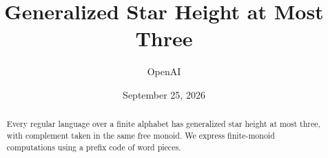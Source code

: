 \documentclass[11pt,a4paper]{article}
\title{Generalized Star Height at Most Three}
\author{OpenAI}
\date{September 25, 2026}
\begin{document}
\maketitle
\begin{abstract}
Every regular language over a finite alphabet has generalized star height
at most three, with complement taken in the same free monoid. We express
finite-monoid computations using a prefix code of word pieces.
\end{abstract}
\tableofcontents










\begingroup
\raggedright


\endgroup
\end{document}
